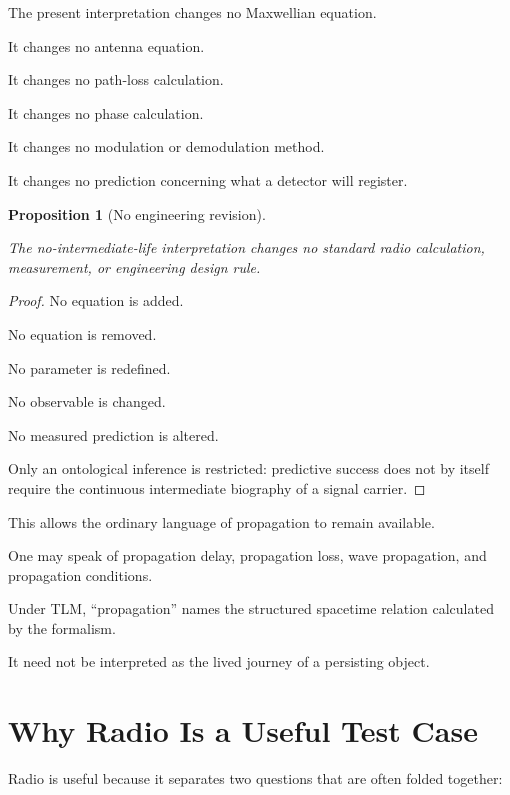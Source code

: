 \documentclass[12pt,onecolumn]{article}
\newtheorem{proposition}{Proposition}[section]
\begin{document}
The present interpretation changes no Maxwellian equation.

It changes no antenna equation.

It changes no path-loss calculation.

It changes no phase calculation.

It changes no modulation or demodulation method.

It changes no prediction concerning what a detector will register.

\begin{proposition}[No engineering revision]
\label{prop:noengineeringrevision}

The no-intermediate-life interpretation changes no standard radio
calculation, measurement, or engineering design rule.

\end{proposition}

\begin{proof}

No equation is added.

No equation is removed.

No parameter is redefined.

No observable is changed.

No measured prediction is altered.

Only an ontological inference is restricted: predictive success does not
by itself require the continuous intermediate biography of a signal
carrier.

\end{proof}

This allows the ordinary language of propagation to remain available.

One may speak of propagation delay, propagation loss, wave propagation,
and propagation conditions.

Under TLM, ``propagation'' names the structured spacetime relation
calculated by the formalism.

It need not be interpreted as the lived journey of a persisting object.

\section{Why Radio Is a Useful Test Case}

Radio is useful because it separates two questions that are often folded
together:
\end{document}
